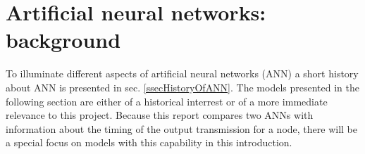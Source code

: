 % 			
% 			
% 			
% 			
% 			
% 			

\section{Artificial neural networks: background}

To illuminate different aspects of artificial neural networks (ANN) a short history about ANN is presented in sec. \ref{ssecHistoryOfANN}. 
The models presented in the following section are either of a historical interrest or of a more immediate relevance to this project.
Because this report compares two ANNs with information about the timing of the output transmission for a node, there will be a special focus on models with this capability in this introduction.  %



